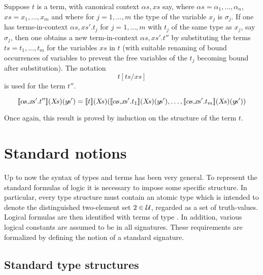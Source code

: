 Suppose $t$ is a term, with canonical context $\alpha\!s,\!x\!s$ say,
where $\alpha\!s = \alpha_1,\ldots,\alpha_n$, $x\!s = x_1,\ldots,x_m$
and where for $j=1,\ldots,m$ the type of the variable $x_j$ is
$\sigma_j$. If one has terms-in-context $\alpha\!s,\!x\!s'.t_{j}$ for
$j=1,\ldots,m$ with $t_{j}$ of the same type as $x_{j}$, say
$\sigma_{j}$, then one obtains a new term-in-context
$\alpha\!s,\!x\!s'.t''$ by substituting the terms
$t\!s=t_1,\ldots,t_m$ for the variables $x\!s$ in $t$ (with suitable
renaming of bound occurrences of variables to prevent the free
variables of the $t_{j}$ becoming bound after substitution). The
notation
\[
t[t\!s/x\!s]
\]
is used for the term $t''$.

\medskip

\[
\den{\alpha\!s,\!x\!s'.t''}(X\!s)(y\!s') = \den{t}(X\!s)(
\den{\alpha\!s,\!x\!s'.t_{1}}(X\!s)(y\!s'),\ldots,
\den{\alpha\!s,\!x\!s'.t_{m}}(X\!s)(y\!s'))
\]

\medskip

Once again, this result is proved by induction on the structure of
the term $t$.


\section{Standard notions}

Up to now the syntax of types and terms  has been  very general.   To
represent the standard  formulas  of  logic  it  is  necessary  to
impose  some specific structure. In  particular, every  type  structure
must contain  an atomic type  which  is  intended  to  denote
the  distinguished two-element set $\mbox{\rm 2}\in{\cal U}$, regarded as a set
of  truth-values.  Logical formulas are then identified with
terms of  type .   In addition, various
logical  constants  are  assumed  to  be  in  all  signatures.    These
requirements are  formalized  by  defining  the  notion  of  a
standard signature.

\subsection{Standard type structures}
\label{standard-type-structures}

